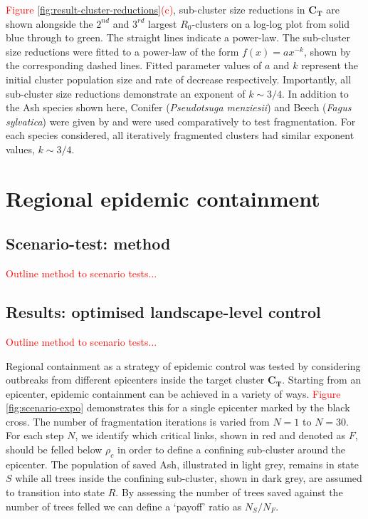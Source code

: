 \textcolor{red}{Figure \ref{fig:result-cluster-reductions}(c)}, sub-cluster size reductions in $\mathbf{C_T}$ are shown alongside the $2^{nd}$ and $3^{rd}$ largest $R_0$-clusters on a log-log plot\textemdash
from solid blue through to green. The straight lines indicate a power-law. 
The sub-cluster size reductions were fitted to a power-law of the form $f(x) = ax^{-k}$, shown by the corresponding dashed lines. 
Fitted parameter values of $a$ and $k$ represent the initial cluster population size and rate of decrease respectively. 
Importantly, all sub-cluster size reductions demonstrate an exponent of $k\sim 3/4$. 
In addition to the Ash species shown here, Conifer (\textit{Pseudotsuga menziesii}) and Beech (\textit{Fagus sylvatica}) were given by \cite{hill.data} and were used comparatively to test fragmentation. 
For each species considered, all iteratively fragmented clusters had similar exponent values, $k\sim 3/4$.

\section{Regional epidemic containment}

\subsection{Scenario-test: method}
\textcolor{red}{Outline method to scenario tests...\blindtext}

\subsection{Results: optimised landscape-level control}

\textcolor{red}{Outline method to scenario tests...}

Regional containment as a strategy of epidemic control was tested by considering outbreaks from different epicenters inside the target cluster $\mathbf{C_T}$. 
Starting from an epicenter, epidemic containment can be achieved in a variety of ways. \textcolor{red}{Figure \ref{fig:scenario-expo}} demonstrates this for a single epicenter marked by the black cross. 
The number of fragmentation iterations is varied from $N=1$ to $N=30$. 
For each step $N$, we identify which critical links, shown in red and denoted as $F$, should be felled below $\rho_c$ in order to define a confining sub-cluster around the epicenter. 
The population of saved Ash, illustrated in light grey, remains in state $S$ while all trees inside the confining sub-cluster, shown in dark grey, are assumed to transition into state $R$. 
By assessing the number of trees saved against the number of trees felled we can define a `payoff' ratio as $N_S/N_F$.

